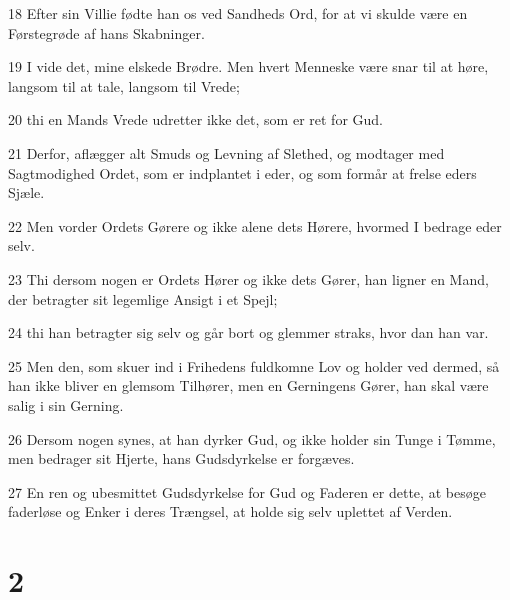 \par 18 Efter sin Villie fødte han os ved Sandheds Ord, for at vi skulde være en Førstegrøde af hans Skabninger.
\par 19 I vide det, mine elskede Brødre. Men hvert Menneske være snar til at høre, langsom til at tale, langsom til Vrede;
\par 20 thi en Mands Vrede udretter ikke det, som er ret for Gud.
\par 21 Derfor, aflægger alt Smuds og Levning af Slethed, og modtager med Sagtmodighed Ordet, som er indplantet i eder, og som formår at frelse eders Sjæle.
\par 22 Men vorder Ordets Gørere og ikke alene dets Hørere, hvormed I bedrage eder selv.
\par 23 Thi dersom nogen er Ordets Hører og ikke dets Gører, han ligner en Mand, der betragter sit legemlige Ansigt i et Spejl;
\par 24 thi han betragter sig selv og går bort og glemmer straks, hvor dan han var.
\par 25 Men den, som skuer ind i Frihedens fuldkomne Lov og holder ved dermed, så han ikke bliver en glemsom Tilhører, men en Gerningens Gører, han skal være salig i sin Gerning.
\par 26 Dersom nogen synes, at han dyrker Gud, og ikke holder sin Tunge i Tømme, men bedrager sit Hjerte, hans Gudsdyrkelse er forgæves.
\par 27 En ren og ubesmittet Gudsdyrkelse for Gud og Faderen er dette, at besøge faderløse og Enker i deres Trængsel, at holde sig selv uplettet af Verden.

\chapter{2}

